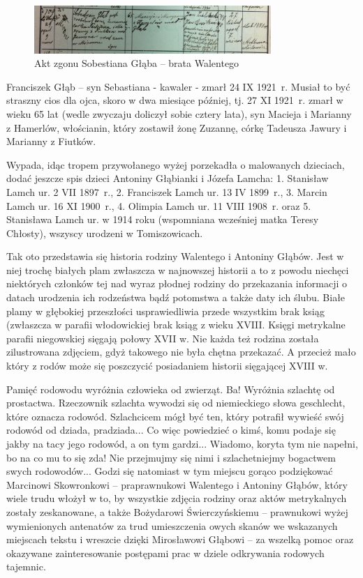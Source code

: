 \begin{figure}[!h]
\begin{center}
\includegraphics[width=0.8\textwidth]{zdjecia/akt_zgonu_sobestiana_glaba.jpg}
\caption[Akt zgonu Sobestiana Głąba]{Akt zgonu Sobestiana Głąba -- brata Walentego}
\label{rys:akt_zgonu_sobestiana_glaba}
\end{center}
\end{figure}

Franciszek Głąb -- syn Sebastiana - kawaler - zmarł 24 IX 1921~r. Musiał to być straszny cios dla ojca, skoro w dwa miesiące później, tj. 27 XI 1921~r. zmarł w wieku 65 lat (wedle zwyczaju doliczył sobie cztery lata), syn Macieja i Marianny z Hamerlów, włościanin, który zostawił żonę Zuzannę, córkę Tadeusza Jawury i Marianny z Fiutków.

Wypada, idąc tropem przywołanego wyżej porzekadła o malowanych dzieciach, dodać jeszcze spis dzieci Antoniny Głąbianki i Józefa Lamcha: 1. Stanisław Lamch ur. 2 VII 1897~r., 2. Franciszek Lamch ur. 13 IV 1899~r., 3. Marcin Lamch ur. 16 XI 1900~r., 4. Olimpia Lamch ur. 11 VIII 1908~r. oraz 5. Stanisława Lamch ur. w 1914 roku (wspomniana wcześniej matka Teresy Chłosty), wszyscy urodzeni w Tomiszowicach.

Tak oto przedstawia się historia rodziny Walentego i Antoniny Głąbów. Jest w niej trochę białych plam zwłaszcza w najnowszej historii a to z powodu niechęci niektórych członków tej nad wyraz płodnej rodziny do przekazania informacji o datach urodzenia ich rodzeństwa bądź potomstwa a także daty ich ślubu. Białe plamy w głębokiej przeszłości usprawiedliwia przede wszystkim brak ksiąg (zwłaszcza w parafii włodowickiej brak ksiąg z wieku XVIII. Księgi metrykalne parafii niegowskiej sięgają połowy XVII w.
Nie każda też rodzina została zilustrowana zdjęciem, gdyż takowego nie była chętna przekazać. A przecież mało który z rodów może się poszczycić posiadaniem historii sięgającej XVIII w. 

Pamięć rodowodu wyróżnia człowieka od zwierząt. Ba! Wyróżnia szlachtę od prostactwa. Rzeczownik szlachta wywodzi się od niemieckiego słowa geschlecht, które oznacza rodowód. Szlachcicem mógł być ten, który potrafił wywieść swój rodowód od dziada, pradziada... Co więc powiedzieć o kimś, komu podaje się jakby na tacy jego rodowód, a on tym gardzi... Wiadomo, koryta tym nie napełni, bo na co mu to się zda! Nie przejmujmy się nimi i szlachetniejmy bogactwem swych rodowodów... Godzi się natomiast w tym miejscu gorąco podziękować Marcinowi Skowronkowi -- praprawnukowi Walentego i Antoniny Głąbów, który wiele trudu włożył w to, by wszystkie zdjęcia rodziny oraz aktów metrykalnych zostały zeskanowane, a także Bożydarowi Świerczyńskiemu -- prawnukowi wyżej wymienionych antenatów za trud umieszczenia owych skanów we wskazanych miejscach tekstu i wreszcie dzięki Mirosławowi Głąbowi -- za wszelką pomoc oraz okazywane zainteresowanie postępami prac w dziele odkrywania rodowych tajemnic.

